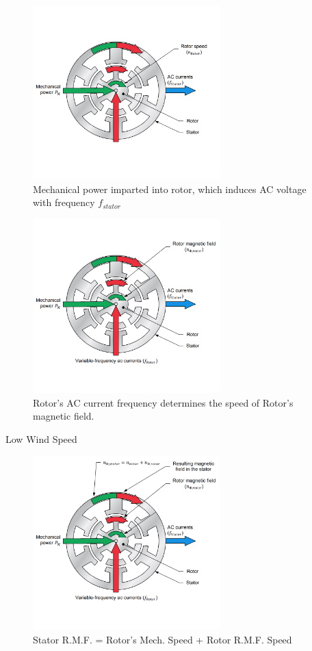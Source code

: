 \documentclass{beamer}
\begin{document}
\begin{frame}{}
    \begin{figure}
        \centering
        \includegraphics[width=2.85in]{imgs/dfigOP (2).jpg}
        \caption{Mechanical power imparted into rotor, which induces AC voltage with frequency $f_{stator}$}

        
    \end{figure}
\end{frame}

\begin{frame}{}
    \begin{figure}
        \centering
        \includegraphics[width=2.85in]{imgs/dfigOP (3).jpg}
        \caption{Rotor's AC current frequency determines the speed of Rotor's magnetic field.}
    \end{figure}
\end{frame}

\begin{frame}{Low Wind Speed}
    \begin{figure}
        \centering
        \includegraphics[width=2.85in]{imgs/dfigOP (4).jpg}
        \caption{Stator R.M.F. = Rotor's Mech. Speed + Rotor R.M.F. Speed}
    \end{figure}
\end{frame}
\end{document}
